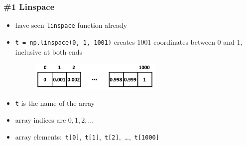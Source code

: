 \documentclass[14pt]{beamer}
\begin{document}
\begin{frame}[fragile]

\frametitle{\#1 Linspace}

\begin{itemize}
	\item have seen \texttt{linspace} function already
	\item \texttt{t = np.linspace(0, 1, 1001)} creates 1001 coordinates between 0 and 1, inclusive at both ends
	
	\begin{figure}[ht]
		\centering
		\includegraphics[width=0.6\textwidth]{figures/arrayElementsMilliseconds}
	\end{figure}

	\item \texttt{t} is the name of the array
	\item array indices are $0, 1, 2, \ldots$
	\item array elements:~\texttt{t[0]},~\texttt{t[1]},~\texttt{t[2]},~\ldots,~\texttt{t[1000]}
\end{itemize}

\end{frame}

\end{document}
